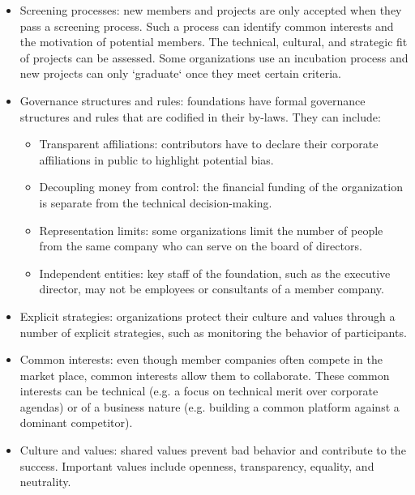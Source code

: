 \begin{itemize}

\item Screening processes: new members and projects are only accepted when they pass a screening process.  Such a process can identify common interests and the motivation of potential members.  The technical, cultural, and strategic fit of projects can be assessed.  Some organizations use an incubation process and new projects can only `graduate` once they meet certain criteria.

\item Governance structures and rules: foundations have formal governance structures and rules that are codified in their by-laws.  They can include:

\begin{itemize}

\item Transparent affiliations: contributors have to declare their corporate affiliations in public to highlight potential bias.

\item Decoupling money from control: the financial funding of the organization is separate from the technical decision-making.

\item Representation limits: some organizations limit the number of people from the same company who can serve on the board of directors.

\item Independent entities: key staff of the foundation, such as the executive director, may not be employees or consultants of a member company.

\end{itemize}

\item Explicit strategies: organizations protect their culture and values through a number of explicit strategies, such as monitoring the behavior of participants.

\item Common interests: even though member companies often compete in the market place, common interests allow them to collaborate.  These common interests can be technical (e.g. a focus on technical merit over corporate agendas) or of a business nature (e.g. building a common platform against a dominant competitor).

\item Culture and values: shared values prevent bad behavior and contribute to the success.  Important values include openness, transparency, equality, and neutrality.

\end{itemize}

